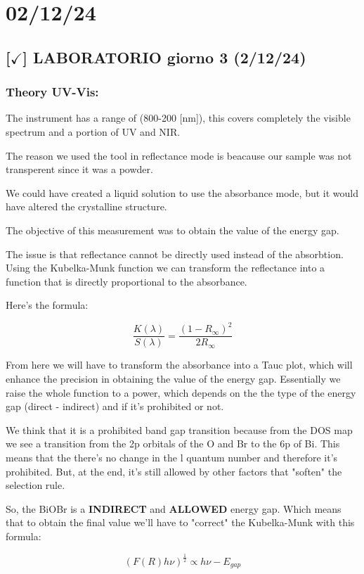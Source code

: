 \section{02/12/24}

\subsection{[$\checkmark$] LABORATORIO giorno 3 (2/12/24)}

\subsubsection{Theory UV-Vis: }

The instrument has a range of (800-200 [nm]), this covers completely the visible spectrum and a portion of UV and NIR. 

The reason we used the tool in reflectance mode is beacause our sample was not transperent since it was a powder.

We could have created a liquid solution to use the absorbance mode, but it would have altered the crystalline structure.

The objective of this measurement was to obtain the value of the energy gap.

The issue is that reflectance cannot be directly used instead of the absorbtion. Using the Kubelka-Munk function we can transform the reflectance into a function that is directly proportional to the absorbance.

Here's the formula: 

$$\frac{K(\lambda)}{S(\lambda)} = \frac{(1-R_{\infty})^2}{2R_{\infty}}$$

From here we will have to transform the absorbance into a Tauc plot, which will enhance the precision in obtaining the value of the energy gap. Essentially we raise the whole function to a power, which depends on the the type of the energy gap (direct - indirect) and if it's prohibited or not.

We think that it is a prohibited band gap transition because from the DOS map we see a transition from the 2p orbitals of the O and Br to the 6p of Bi. This means that the there's no change in the l quantum number and therefore it's prohibited. But, at the end, it's still allowed by other factors that "soften" the selection rule. 


So, the BiOBr is a \textbf{INDIRECT} and \textbf{ALLOWED} energy gap. Which means that to obtain the final value we'll have to "correct" the Kubelka-Munk with this formula:

$$(F(R)h\nu)^{\frac{1}{2}}\propto h\nu - E_{gap}$$
